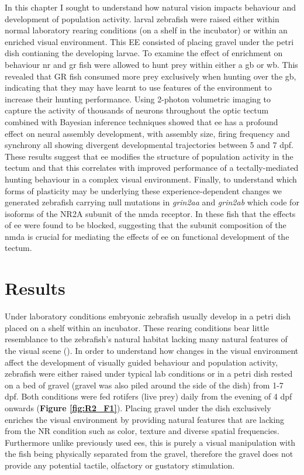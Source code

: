 In this chapter I sought to understand how natural vision impacts behaviour and development of population activity. larval zebrafish were raised either within normal laboratory rearing conditions (on a shelf in the incubator) or within an enriched visual environment. This \gls{EE} consisted of placing gravel under the petri dish contianing the developing larvae. To examine the effect of enrichment on behaviour \gls{nr} and \gls{gr} fish were allowed to hunt prey within either a \gls{gb} or \gls{wb}. This revealed that GR fish consumed more prey exclusively when hunting over the \gls{gb}, indicating that they may have learnt to use features of the environment to increase their hunting performance. Using 2-photon volumetric imaging to capture the activity of thousands of neurons throughout the optic tectum combined with Bayesian inference techniques showed that \gls{ee} has a profound effect on neural assembly development, with assembly size, firing frequency and synchrony all showing divergent developmental trajectories between 5 and 7 \gls{dpf}. These results suggest that \gls{ee} modifies the structure of population activity in the tectum and that this correlates with improved performance of a tectally-mediated hunting behaviour in a complex visual environment.  Finally, to understand which forms of plasticity may be underlying these experience-dependent changes we generated zebrafish carrying null mutations in \textit{grin2aa} and \textit{grin2ab} which code for isoforms of the NR2A subunit of the \gls{nmda} receptor. In these fish that the effects of \gls{ee} were found to be  blocked, suggesting that the subunit composition of the \gls{nmda} is crucial for mediating the effects of \gls{ee} on functional development of the tectum.
 
\section{Results}
Under laboratory conditions embryonic zebrafish usually develop in a petri dish placed on a shelf within an incubator. These rearing conditions bear little resemblance to the zebrafish's natural habitat lacking many natural features of the visual scene (\cite{Engeszer2007ZebrafishField}). In order to understand how changes in the visual environment affect the development of visually guided behaviour and population activity, zebrafish were either raised under typical lab conditions or in a petri dish rested on a bed of gravel (gravel was also piled around the side of the dish) from 1-7 \gls{dpf}. Both conditions were fed rotifers (live prey) daily from the evening of 4 \gls{dpf} onwards (\textbf{Figure \ref{fig:R2_F1}}).  Placing gravel under the dish exclusively enriches the visual environment by providing natural features that are lacking from the NR condition such as color, texture and diverse spatial frequencies. Furthermore unlike previously used \gls{ee}s, this is purely a visual manipulation with the fish being physically separated from the gravel, therefore the gravel does not provide any potential tactile, olfactory or gustatory stimulation.


